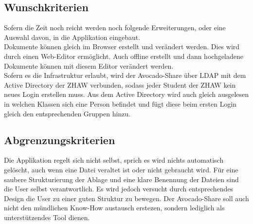 \subsection{Wunschkriterien}
Sofern die Zeit noch reicht werden noch folgende Erweiterungen, oder eine Auswahl davon, in die Applikation eingebaut.\\
Dokumente können gleich im Browser erstellt und verändert werden. Dies wird durch einen Web-Editor ermöglicht. Auch offline erstellt und dann hochgeladene Dokumente können mit diesem Editor verändert werden.\\
Sofern es die Infrastruktur erlaubt, wird der Avocado-Share über LDAP mit dem Active Directory der ZHAW verbunden, sodass jeder Student der ZHAW kein neues Login erstellen muss. Aus dem Active Directory wird auch gleich ausgelesen in welchen Klassen sich eine Person befindet und fügt diese beim ersten Login gleich den entsprechenden Gruppen hinzu.\\
\subsection{Abgrenzungskriterien}
Die Applikation regelt sich nicht selbst, sprich es wird nichts automatisch gelöscht, auch wenn eine Datei veraltet ist oder nicht gebraucht wird. Für eine saubere Strukturierung der Ablage und eine klare Benennung der Dateien sind die User selbst verantwortlich. Es wird jedoch versucht durch entsprechendes Design die User zu einer guten Struktur zu bewegen. Der Avocado-Share soll auch nicht den mündlichen Know-How austausch erstezen, sondern lediglich als unterstützendes Tool dienen.